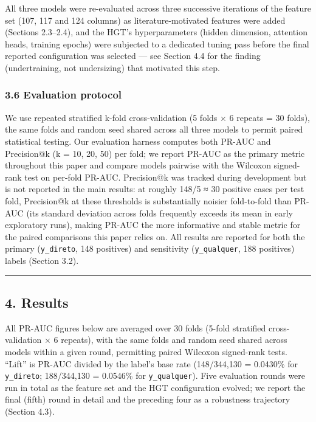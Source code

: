 \documentclass[11pt,]{article}
\begin{document}
All three models were re-evaluated across three successive iterations of
the feature set (107, 117 and 124 columns) as literature-motivated
features were added (Sections 2.3--2.4), and the HGT's hyperparameters
(hidden dimension, attention heads, training epochs) were subjected to a
dedicated tuning pass before the final reported configuration was
selected --- see Section 4.4 for the finding (undertraining, not
undersizing) that motivated this step.

\hypertarget{evaluation-protocol}{%
\subsubsection{3.6 Evaluation protocol}\label{evaluation-protocol}}

We use repeated stratified k-fold cross-validation (5 folds × 6 repeats
= 30 folds), the same folds and random seed shared across all three
models to permit paired statistical testing. Our evaluation harness
computes both PR-AUC and Precision@k (k = 10, 20, 50) per fold; we
report PR-AUC as the primary metric throughout this paper and compare
models pairwise with the Wilcoxon signed-rank test on per-fold PR-AUC.
Precision@k was tracked during development but is not reported in the
main results: at roughly 148/5 ≈ 30 positive cases per test fold,
Precision@k at these thresholds is substantially noisier fold-to-fold
than PR-AUC (its standard deviation across folds frequently exceeds its
mean in early exploratory runs), making PR-AUC the more informative and
stable metric for the paired comparisons this paper relies on. All
results are reported for both the primary (\texttt{y\_direto}, 148
positives) and sensitivity (\texttt{y\_qualquer}, 188 positives) labels
(Section 3.2).

\begin{center}\rule{0.5\linewidth}{0.5pt}\end{center}

\hypertarget{results}{%
\subsection{4. Results}\label{results}}

All PR-AUC figures below are averaged over 30 folds (5-fold stratified
cross-validation × 6 repeats), with the same folds and random seed
shared across models within a given round, permitting paired Wilcoxon
signed-rank tests. ``Lift'' is PR-AUC divided by the label's base rate
(148/344,130 = 0.0430\% for \texttt{y\_direto}; 188/344,130 = 0.0546\%
for \texttt{y\_qualquer}). Five evaluation rounds were run in total as
the feature set and the HGT configuration evolved; we report the final
(fifth) round in detail and the preceding four as a robustness
trajectory (Section 4.3).
\end{document}
